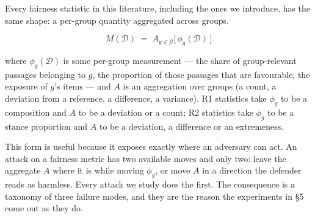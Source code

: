 \documentclass[authoryear,review,3p,times]{elsarticle}
\begin{document}
Every fairness statistic in this literature, including the ones we introduce, has the same shape: a per-group quantity aggregated across groups.

\[M(\mathcal{D}) \;=\; A_{g \in \mathcal{G}}\bigl[\,\phi_g(\mathcal{D})\,\bigr] \tag{2}\]

where \(\phi_g(\mathcal{D})\) is some per-group measurement --- the share of group-relevant passages belonging to \(g\), the proportion of those passages that are favourable, the exposure of \(g\)'s items --- and \(A\) is an aggregation over groups (a count, a deviation from a reference, a difference, a variance). R1 statistics take \(\phi_g\) to be a composition and \(A\) to be a deviation or a count; R2 statistics take \(\phi_g\) to be a stance proportion and \(A\) to be a deviation, a difference or an extremeness.

This form is useful because it exposes exactly where an adversary can act. An attack on a fairness metric has two available moves and only two: leave the aggregate \(A\) where it is while moving \(\phi_g\), or move \(A\) in a direction the defender reads as harmless. Every attack we study does the first. The consequence is a taxonomy of three failure modes, and they are the reason the experiments in §5 come out as they do.
\end{document}
